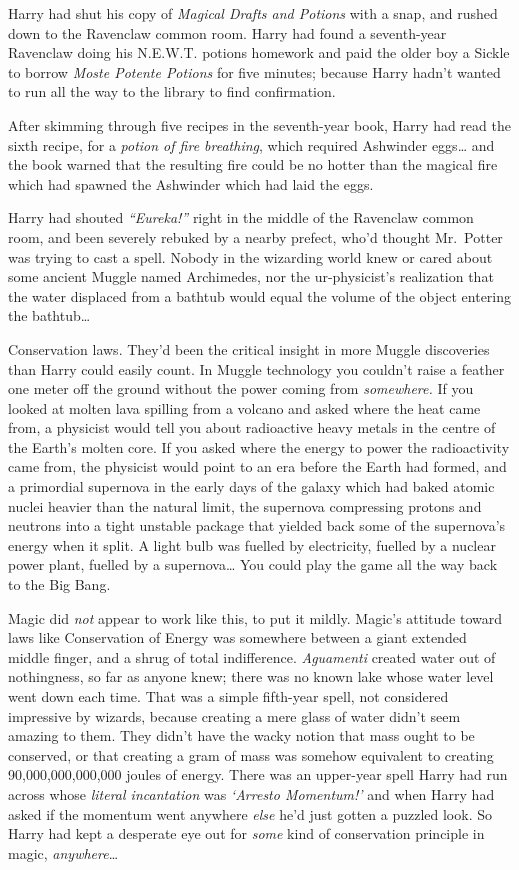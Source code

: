 Harry had shut his copy of \emph{Magical Drafts and Potions} with a
snap, and rushed down to the Ravenclaw common room. Harry had found a
seventh-year Ravenclaw doing his N.E.W.T. potions homework and paid the
older boy a Sickle to borrow \emph{Moste Potente Potions} for five
minutes; because Harry hadn't wanted to run all the way to the library
to find confirmation.

After skimming through five recipes in the seventh-year book, Harry had
read the sixth recipe, for a \emph{potion of fire breathing}, which
required Ashwinder eggs\ldots{} and the book warned that the resulting
fire could be no hotter than the magical fire which had spawned the
Ashwinder which had laid the eggs.

Harry had shouted \emph{``Eureka!''} right in the middle of the
Ravenclaw common room, and been severely rebuked by a nearby prefect,
who'd thought Mr.~Potter was trying to cast a spell. Nobody in the
wizarding world knew or cared about some ancient Muggle named
Archimedes, nor the ur-physicist's realization that the water displaced
from a bathtub would equal the volume of the object entering the
bathtub\ldots{}

Conservation laws. They'd been the critical insight in more Muggle
discoveries than Harry could easily count. In Muggle technology you
couldn't raise a feather one meter off the ground without the power
coming from \emph{somewhere.} If you looked at molten lava spilling from
a volcano and asked where the heat came from, a physicist would tell you
about radioactive heavy metals in the centre of the Earth's molten core.
If you asked where the energy to power the radioactivity came from, the
physicist would point to an era before the Earth had formed, and a
primordial supernova in the early days of the galaxy which had baked
atomic nuclei heavier than the natural limit, the supernova compressing
protons and neutrons into a tight unstable package that yielded back
some of the supernova's energy when it split. A light bulb was fuelled
by electricity, fuelled by a nuclear power plant, fuelled by a
supernova\ldots{} You could play the game all the way back to the Big
Bang.

Magic did \emph{not} appear to work like this, to put it mildly. Magic's
attitude toward laws like Conservation of Energy was somewhere between a
giant extended middle finger, and a shrug of total indifference.
\emph{Aguamenti} created water out of nothingness, so far as anyone
knew; there was no known lake whose water level went down each time.
That was a simple fifth-year spell, not considered impressive by
wizards, because creating a mere glass of water didn't seem amazing to
them. They didn't have the wacky notion that mass ought to be conserved,
or that creating a gram of mass was somehow equivalent to creating
90,000,000,000,000 joules of energy. There was an upper-year spell Harry
had run across whose \emph{literal incantation} was \emph{`Arresto
Momentum!'} and when Harry had asked if the momentum went anywhere
\emph{else} he'd just gotten a puzzled look. So Harry had kept a
desperate eye out for \emph{some} kind of conservation principle in
magic, \emph{anywhere}\ldots{}

